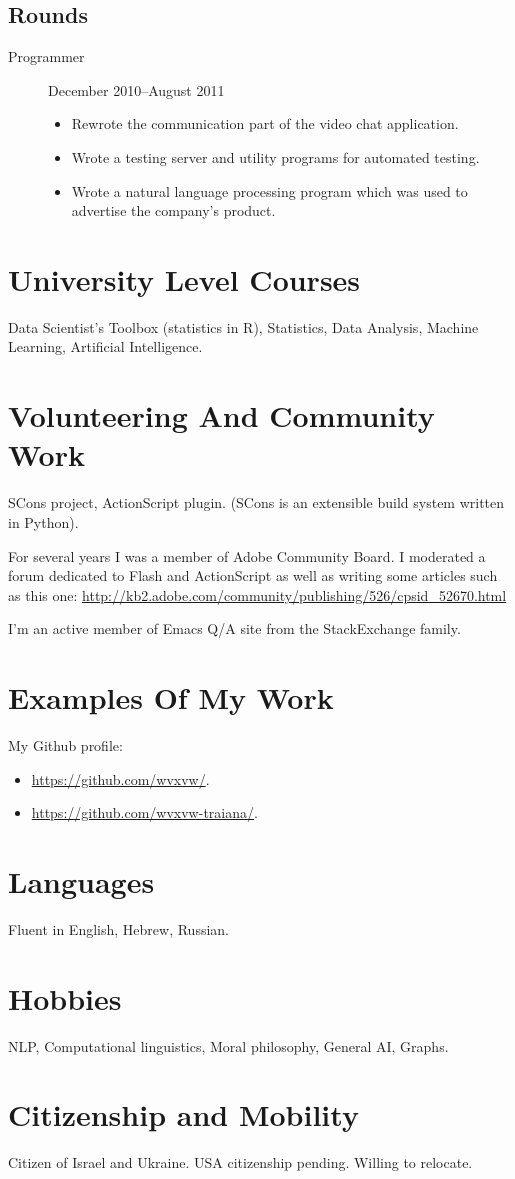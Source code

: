\documentclass[11pt]{article}
\begin{document}
\subsection*{Rounds}
\label{sec:org8e60932}
\begin{description}
\item[{Programmer}] December 2010--August 2011
\begin{itemize}
\item Rewrote the communication part of the video chat application.
\item Wrote a testing server and utility programs for automated
testing.
\item Wrote a natural language processing program which was used
to advertise the company's product.
\end{itemize}
\end{description}

\section*{University Level Courses}
\label{sec:org5de856e}
Data Scientist's Toolbox (statistics in R), Statistics, Data
Analysis, Machine Learning, Artificial Intelligence.

\section*{Volunteering And Community Work}
\label{sec:org609ba34}
SCons project, ActionScript plugin.  (SCons is an extensible build system
written in Python).

For several years I was a member of Adobe Community Board. I moderated a forum
dedicated to Flash and ActionScript as well as writing some articles such as
this one: \url{http://kb2.adobe.com/community/publishing/526/cpsid\_52670.html}

I'm an active member of Emacs Q/A site from the StackExchange family.

\section*{Examples Of My Work}
\label{sec:org13b7d06}
My Github profile:
\begin{itemize}
\item \url{https://github.com/wvxvw/}.
\item \url{https://github.com/wvxvw-traiana/}.
\end{itemize}

\section*{Languages}
\label{sec:org1f05802}
Fluent in English, Hebrew, Russian.

\section*{Hobbies}
\label{sec:org3f4b02a}
NLP, Computational linguistics, Moral philosophy, General AI, Graphs.

\section*{Citizenship and Mobility}
\label{sec:orgd654cb1}
Citizen of Israel and Ukraine.  USA citizenship pending.  Willing
to relocate.
\end{document}
